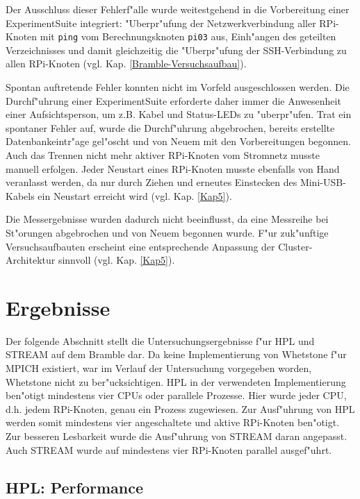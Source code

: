 \noindent 
Der Ausschluss dieser Fehlerf"alle wurde weitestgehend in die Vorbereitung einer ExperimentSuite integriert: "Uberpr"ufung der Netzwerkverbindung aller RPi-Knoten mit \texttt{ping} vom Berechnungsknoten \texttt{pi03} aus, Einh"angen des geteilten Verzeichnisses und damit gleichzeitig die  "Uberpr"ufung der SSH-Verbindung zu allen RPi-Knoten (vgl. Kap. \ref{Bramble-Versuchsaufbau}). 

Spontan auftretende Fehler konnten nicht im Vorfeld ausgeschlossen werden. Die Durchf"uh\-rung einer ExperimentSuite erforderte daher immer die Anwesenheit einer Aufsichtsperson, um z.B. Kabel und Status-LEDs zu "uberpr"ufen. Trat ein spontaner Fehler auf, wurde die Durch\-f"uh\-rung abgebrochen, bereits erstellte Datenbankeintr"age gel"oscht und von Neuem mit den Vorbereitungen begonnen. Auch das Trennen nicht mehr aktiver RPi-Knoten vom Stromnetz musste manuell erfolgen. Jeder Neustart eines RPi-Knoten musste ebenfalls von Hand veranlasst werden, da nur durch Ziehen und erneutes Einstecken des Mini-USB-Kabels ein Neustart erreicht wird (vgl. Kap. \ref{Kap5}). 

Die Messergebnisse wurden dadurch nicht beeinflusst, da eine Messreihe bei St"orungen abgebrochen und von Neuem begonnen wurde. F"ur zuk"unftige Versuchsaufbauten erscheint eine entsprechende Anpassung der Cluster-Architektur sinnvoll (vgl. Kap. \ref{Kap5}).

\section{Ergebnisse}\label{Ergebnisse}

Der folgende Abschnitt stellt die Untersuchungsergebnisse f"ur HPL und STREAM auf dem Bramble dar. Da keine Implementierung von Whetstone f"ur MPICH existiert, war im Verlauf der Untersuchung vorgegeben worden, Whetstone nicht zu ber"ucksichtigen. HPL in der verwendeten Implementierung ben"otigt mindestens vier CPUs oder parallele Prozesse. Hier wurde jeder CPU, d.h. jedem RPi-Knoten, genau ein Prozess zugewiesen. Zur Ausf"uhrung von HPL werden somit mindestens vier angeschaltete und aktive RPi-Knoten ben"otigt. Zur besseren Lesbarkeit wurde die Ausf"uhrung von STREAM daran angepasst. Auch STREAM wurde auf mindestens vier RPi-Knoten parallel ausgef"uhrt. 

\subsection{HPL: Performance}\label{Ergebnisse-HPL}

